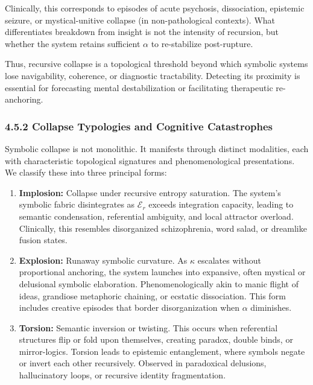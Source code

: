 Clinically, this corresponds to episodes of acute psychosis, dissociation, epistemic seizure, or mystical-unitive collapse (in non-pathological contexts). What differentiates breakdown from insight is not the intensity of recursion, but whether the system retains sufficient $\alpha$ to re-stabilize post-rupture.

Thus, recursive collapse is a topological threshold beyond which symbolic systems lose navigability, coherence, or diagnostic tractability. Detecting its proximity is essential for forecasting mental destabilization or facilitating therapeutic re-anchoring.

\subsubsection*{4.5.2 Collapse Typologies and Cognitive Catastrophes}

Symbolic collapse is not monolithic. It manifests through distinct modalities, each with characteristic topological signatures and phenomenological presentations. We classify these into three principal forms:

\begin{enumerate}
  \item \textbf{Implosion:} Collapse under recursive entropy saturation. The system’s symbolic fabric disintegrates as $\mathcal{E}_r$ exceeds integration capacity, leading to semantic condensation, referential ambiguity, and local attractor overload. Clinically, this resembles disorganized schizophrenia, word salad, or dreamlike fusion states.

  \item \textbf{Explosion:} Runaway symbolic curvature. As $\kappa$ escalates without proportional anchoring, the system launches into expansive, often mystical or delusional symbolic elaboration. Phenomenologically akin to manic flight of ideas, grandiose metaphoric chaining, or ecstatic dissociation. This form includes creative episodes that border disorganization when $\alpha$ diminishes.

  \item \textbf{Torsion:} Semantic inversion or twisting. This occurs when referential structures flip or fold upon themselves, creating paradox, double binds, or mirror-logics. Torsion leads to epistemic entanglement, where symbols negate or invert each other recursively. Observed in paradoxical delusions, hallucinatory loops, or recursive identity fragmentation.
\end{enumerate}


